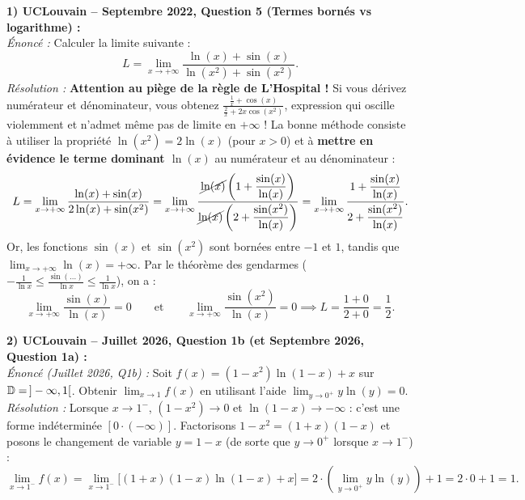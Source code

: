 \begin{exemple}
\textbf{1) UCLouvain -- Septembre 2022, Question 5 (Termes bornés vs logarithme) :}\\
\emph{Énoncé :} Calculer la limite suivante :
\[
    L = \lim_{x \to +\infty} \frac{\ln(x) + \sin(x)}{\ln(x^2) + \sin(x^2)}.
\]
\emph{Résolution :} \textbf{Attention au piège de la règle de L'Hospital !} Si vous dérivez numérateur et dénominateur, vous obtenez $\frac{\frac{1}{x} + \cos(x)}{\frac{2}{x} + 2x\cos(x^2)}$, expression qui oscille violemment et n'admet même pas de limite en $+\infty$ !
La bonne méthode consiste à utiliser la propriété $\ln(x^2) = 2\ln(x)$ (pour $x > 0$) et à \textbf{mettre en évidence le terme dominant $\ln(x)$} au numérateur et au dénominateur :
\[
    L = \lim_{x \to +\infty} \frac{\ln(x) + \sin(x)}{2\ln(x) + \sin(x^2)} = \lim_{x \to +\infty} \frac{\cancel{\ln(x)}\left(1 + \dfrac{\sin(x)}{\ln(x)}\right)}{\cancel{\ln(x)}\left(2 + \dfrac{\sin(x^2)}{\ln(x)}\right)} = \lim_{x \to +\infty} \frac{1 + \dfrac{\sin(x)}{\ln(x)}}{2 + \dfrac{\sin(x^2)}{\ln(x)}}.
\]
Or, les fonctions $\sin(x)$ et $\sin(x^2)$ sont bornées entre $-1$ et $1$, tandis que $\lim_{x \to +\infty} \ln(x) = +\infty$. Par le théorème des gendarmes ($-\frac{1}{\ln x} \le \frac{\sin(\dots)}{\ln x} \le \frac{1}{\ln x}$), on a :
\[
    \lim_{x \to +\infty} \frac{\sin(x)}{\ln(x)} = 0 \qquad \text{et} \qquad \lim_{x \to +\infty} \frac{\sin(x^2)}{\ln(x)} = 0 \implies L = \frac{1 + 0}{2 + 0} = \boxed{\frac{1}{2}}.
\]

\medskip
\textbf{2) UCLouvain -- Juillet 2026, Question 1b (et Septembre 2026, Question 1a) :}\\
\emph{Énoncé (Juillet 2026, Q1b) :} Soit $f(x) = (1 - x^2)\ln(1 - x) + x$ sur $\mathbb{D} = \,]-\infty, 1[$. Obtenir $\lim_{x \to 1} f(x)$ en utilisant l'aide $\lim_{y \to 0^+} y\ln(y) = 0$.\\
\emph{Résolution :} Lorsque $x \to 1^-$, $(1-x^2) \to 0$ et $\ln(1-x) \to -\infty$ : c'est une forme indéterminée $[0 \cdot (-\infty)]$. Factorisons $1 - x^2 = (1+x)(1-x)$ et posons le changement de variable $y = 1 - x$ (de sorte que $y \to 0^+$ lorsque $x \to 1^-$) :
\[
    \lim_{x \to 1^-} f(x) = \lim_{x \to 1^-} \bigl[(1+x)(1-x)\ln(1-x) + x\bigr] = 2 \cdot \left(\lim_{y \to 0^+} y\ln(y)\right) + 1 = 2 \cdot 0 + 1 = \boxed{1}.
\]


\end{exemple}
